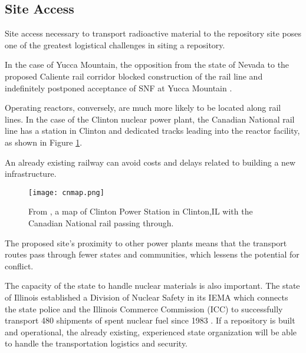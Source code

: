 \subsection{Site Access}



Site access necessary to transport radioactive material to the repository site 
poses one of the greatest logistical challenges in siting a repository. 

In the case of Yucca Mountain, 
the opposition from the state of Nevada to the proposed Caliente rail corridor 
blocked construction of the rail line and indefinitely postponed
acceptance of \gls{SNF} at Yucca Mountain \cite{halstead_yucca_2011}.

Operating reactors, conversely, are much more likely to be located along rail 
lines. In the case of the Clinton nuclear power plant, 
the Canadian National rail line \cite{waleed_regional_2015} has a station in 
Clinton and dedicated tracks leading into the reactor facility, as shown in 
Figure \ref{fig:cnmap}.

An already existing railway can avoid costs and delays related to building a 
new infrastructure.

\begin{figure}[!h] 
  \centering
  \texttt{[image: cnmap.png]}	
        \caption{From \cite{canadian_national_railway_company_canadian_2016}, a map of Clinton Power Station in Clinton,IL
        with the Canadian National rail passing through.}
  \label{fig:cnmap}
\end{figure}

The proposed site's proximity to other power plants means that the transport
routes pass through fewer states and communities, which lessens the potential 
for conflict.

The capacity of the state to handle nuclear materials is also important.
The state of Illinois established a Division of Nuclear Safety in its \gls{IEMA}
which connects the state police and the Illinois Commerce Commission (ICC) to
 successfully transport 480 shipments of spent nuclear fuel since 1983
 \cite{iema_illinois_2005}. If a repository is built and operational, the already existing,
 experienced state organization will be able to handle the transportation logistics
 and security.  

